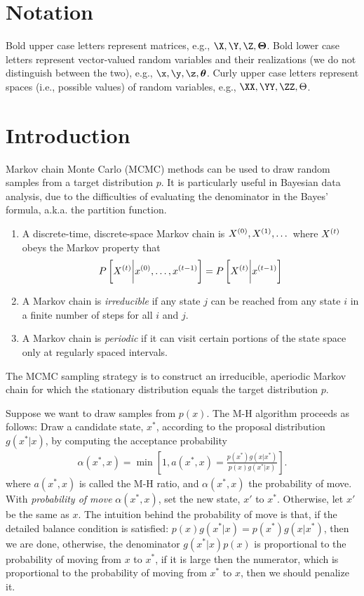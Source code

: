 \section{Notation}
Bold upper case letters represent matrices, e.g., $\X, \Y, \Z, \bTheta$. Bold lower case letters represent vector-valued random variables and their realizations (we do not distinguish between the two), e.g., $\x, \y, \z, \btheta$. Curly upper case letters represent spaces (i.e., possible values) of random variables, e.g., $\XX, \YY, \ZZ, \Theta$.

\section{Introduction}
Markov chain Monte Carlo (MCMC) methods can be used to draw random samples from a target distribution $p$. It is particularly useful in Bayesian data analysis, due to the difficulties of evaluating the denominator in the Bayes' formula, a.k.a. the partition function.

\begin{enumerate}
\item A discrete-time, discrete-space Markov chain is ${X}^{(0)}, {X}^{(1)}, \dots$ where ${X}^{(t)}$ obeys the Markov property that
\begin{align}
P\left[{X}^{(t)} \bigg| {x}^{(0)},\dots,{x}^{(t-1)}\right] = P\left[{X}^{(t)} \bigg| {x}^{(t-1)} \right]
\end{align}
\item A Markov chain is {\em{irreducible}} if any state $j$ can be reached from any state $i$ in a finite number of steps for all $i$ and $j$.
\item A Markov chain is {\em{periodic}} if it can visit certain portions of the state space only at regularly spaced intervals.
\end{enumerate}

The MCMC sampling strategy is to construct an irreducible, aperiodic Markov chain for which the stationary distribution equals the target distribution $p$.

Suppose we want to draw samples from $p(x)$. The M-H algorithm proceeds as follows: Draw a candidate state, $x^*$, according to the proposal distribution $g(x^*|x)$, by computing the acceptance probability
\begin{align}
\alpha(x^*, x) = \min\left[1, a(x^*,x) = \frac{p(x^*)g(x|x^*)}{p(x)g(x^*|x)}\right].
\end{align}
where $a(x^*,x)$ is called the M-H ratio, and $\alpha(x^*,x)$ the probability of move. With {\em{probability of move}} $\alpha(x^*, x)$, set the new state, $x'$ to $x^*$. Otherwise, let $x'$ be the same as $x$. The intuition behind the probability of move is that, if the detailed balance condition is satisfied: $p(x)g(x^*|x) = p(x^*)g(x|x^*)$, then we are done, otherwise, the denominator $g(x^*|x)p(x)$ is proportional to the probability of moving from $x$ to $x^*$, if it is large then the numerator, which is proportional to the probability of moving from $x^*$ to $x$, then we should penalize it.

